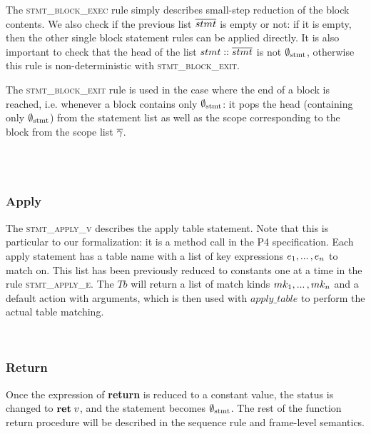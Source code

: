\documentclass[UTF8]{article}
\begin{document}
The \textsc{stmt\_block\_exec} rule simply describes small-step reduction of the block contents. We also check if the previous list $\overline{stmt}$ is empty or not: if it is empty, then the other single block statement rules can be applied directly. It is also important to check that the head of the list $stmt::\overline{stmt}$ is not $\emptyset_{ \mathrm{stmt} }{}$, otherwise this rule is non-deterministic with \textsc{stmt\_block\_exit}.

The \textsc{stmt\_block\_exit} rule is used in the case where the end of a block is reached, i.e. whenever a block contains only $\emptyset_{ \mathrm{stmt} }{}$: it pops the head (containing only $\emptyset_{ \mathrm{stmt} }{}$) from the statement list as well as the scope corresponding to the block from the scope list $\overline{\gamma}$.

\begin{figure}[ht!]
    \ottusedrule{\ottdrulestmtXXblockXXenter{}} \\
    \ottusedrule{\ottdrulestmtXXblockXXexec{}} \\
    \ottusedrule{\ottdrulestmtXXblockXXexit{}} 
\end{figure}


\subsubsection*{Apply} 
The \textsc{stmt\_apply\_v} describes the apply table statement. Note that this is particular to our formalization: it is a method call in the P4 specification. Each apply statement has a table name \tn{} with a list of key expressions $e_1 , ... \, , e_n$ to match on. This list has been previously reduced to constants one at a time in the rule \textsc{stmt\_apply\_e}. The $Tb$ will return a list of match kinds $mk_1 , ... \, , mk_n$ and a default action with arguments, which is then used with $\mathit{apply\_table}$ to perform the actual table matching. %


\begin{figure}[ht!]
    \ottusedrule{\ottdrulestmtXXapplyXXtableXXe{}} \\
    \ottusedrule{\ottdrulestmtXXapplyXXtableXXv{}} 
\end{figure}

\subsubsection*{Return}
Once the expression of \textbf{return} is reduced to a constant value, the status is changed to $\textbf{ret}\;v$, and the statement becomes $\emptyset_{ \mathrm{stmt} }{}$. The rest of the function return procedure will be described in the sequence rule and frame-level semantics.
\end{document}
